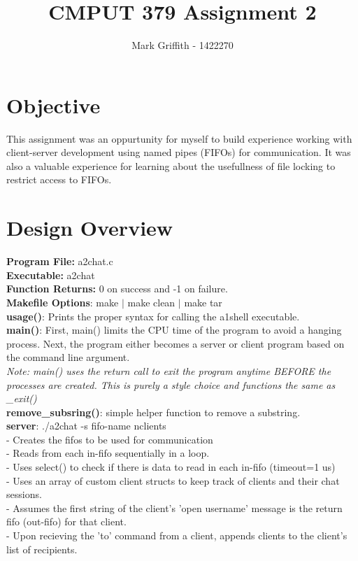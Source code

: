 \documentclass{article}
\begin{document}
\title{CMPUT 379 Assignment 2}
\author{Mark Griffith - 1422270}

\maketitle

\section{Objective}
This assignment was an oppurtunity for myself to build experience
working with client-server development using named pipes (FIFOs) for
communication. It was also a valuable experience for learning
about the usefullness of file locking to restrict access to FIFOs.

\section{Design Overview}

\textbf{Program File:} a2chat.c \\
\textbf{Executable:} a2chat \\
\textbf{Function Returns:} 0 on success and -1 on failure. \\
\textbf{Makefile Options}: make $|$ make clean $|$ make tar \\

\noindent
\textbf{usage()}: Prints the proper syntax for calling the a1shell executable. \\

\noindent
\textbf{main()}: First, main() limits the CPU time of the program to avoid a hanging
process.
Next, the program either becomes a server or client program based
on the command line argument. \\

\noindent
\textit{Note: main() uses the return call to exit the program anytime BEFORE the processes
are created. This is purely a style choice and functions the same as \_exit()} \\

\noindent
\textbf{remove\_subsring()}: simple helper function to remove a substring. \\

\noindent
\textbf{server}: ./a2chat -s fifo-name nclients \\
- Creates the fifos to be used for communication \\
- Reads from each in-fifo sequentially in a loop. \\
- Uses select() to check if there is data to read
in each in-fifo (timeout=1 us) \\
- Uses an array of custom client structs to keep track
of clients and their chat sessions. \\
- Assumes the first string of the client's 'open username'
message is the return fifo (out-fifo) for that client. \\
- Upon recieving the 'to' command from a client, appends
clients to the client's list of recipients. \\
\end{document}
